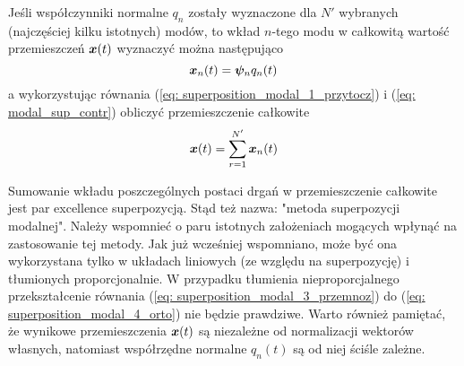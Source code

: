 Jeśli współczynniki normalne $q_n$ zostały wyznaczone dla $N'$ wybranych (najczęściej kilku istotnych) modów, to wkład $n$-tego modu w całkowitą wartość przemieszczeń $\bm{x}(t)$ wyznaczyć można następująco
\begin{equation} \label{eq: modal_sup_contr}
	\bm{x}_n(t) = \bm{\psi}_n q_n(t)
\end{equation}
a wykorzystując równania (\ref{eq: superposition_modal_1_przytocz}) i (\ref{eq: modal_sup_contr}) obliczyć przemieszczenie całkowite
\begin{equation}
		\bm{x}(t) = \sum_{r=1}^{N'} \bm{x}_n(t)
\end{equation}

Sumowanie wkładu poszczególnych postaci drgań w przemieszczenie całkowite jest par excellence superpozycją. Stąd też nazwa: "metoda superpozycji modalnej". Należy wspomnieć o paru istotnych założeniach mogących wpłynąć na zastosowanie tej metody. Jak już wcześniej wspomniano, może być ona wykorzystana tylko w układach liniowych (ze względu na superpozycję) i tłumionych proporcjonalnie. W przypadku tłumienia nieproporcjalnego przekształcenie równania (\ref{eq: superposition_modal_3_przemnoz}) do (\ref{eq: superposition_modal_4_orto}) nie będzie prawdziwe. Warto również pamiętać, że wynikowe przemieszczenia $\bm{x}(t)$ są niezależne od normalizacji wektorów własnych, natomiast współrzędne normalne $q_n(t)$ są od niej ściśle zależne. 

